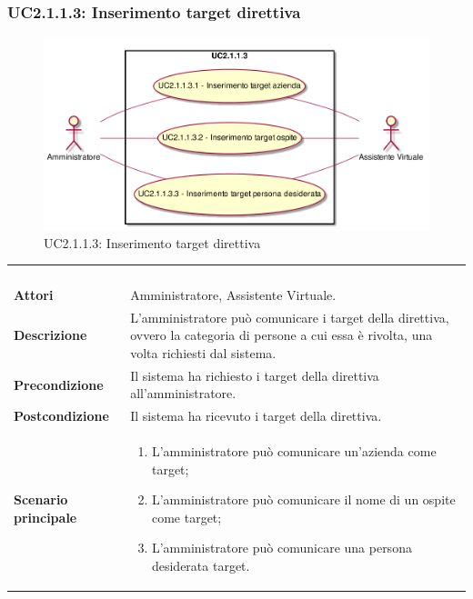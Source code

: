 \newpage\subsubsection{UC2.1.1.3: Inserimento target direttiva}
\label{UC2.1.1.3}
\begin{figure}[h]
	\centering
	\includegraphics[width=\textwidth,height=\textheight,keepaspectratio]{images/UseCaseUC2113.png}
	\caption{UC2.1.1.3: Inserimento target direttiva}
\end{figure}
\begin{longtable}{l|p{10cm}}
	\rowcolor[gray]{0.8} \multicolumn{2}{c}{} \\
	\rowcolor[gray]{0.8} \multicolumn{2}{c}{\textbf{UC2.1.1.3 - Inserimento target direttiva}} \\
	\rowcolor[gray]{0.8} \multicolumn{2}{c}{} \\
	\hline
	&\\
	\textbf{Attori} & Amministratore, Assistente Virtuale.\\[7pt]
	\textbf{Descrizione} & L'amministratore può comunicare i target della direttiva, ovvero la categoria di persone a cui essa è rivolta, una volta richiesti dal sistema.\\[7pt]
	\textbf{Precondizione} & Il sistema ha richiesto i target della direttiva all'amministratore.\\[7pt]
	\textbf{Postcondizione} & Il sistema ha ricevuto i target della direttiva.\\[7pt]
	\textbf{Scenario principale} &\begin{enumerate}
		\item  L'amministratore può comunicare un'azienda come target;
		\item  L'amministratore può comunicare il nome di un ospite come target;
		\item  L'amministratore può comunicare una persona desiderata target.
	\end{enumerate}
	\\[7pt]\hline
\end{longtable}


